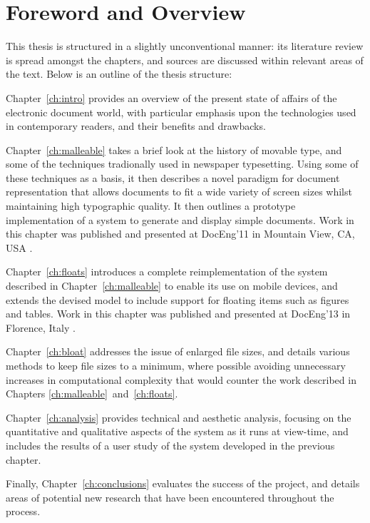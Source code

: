 \chapter{Foreword and Overview}
This thesis is structured in a slightly unconventional manner: its literature review is spread amongst the chapters, and sources are discussed within relevant areas of the text. Below is an outline of the thesis structure:

\vspace{1em}
\noindent Chapter~\ref{ch:intro} provides an overview of the present state of affairs of the electronic document world, with particular emphasis upon the technologies used in contemporary \ebook{} readers, and their benefits and drawbacks.

\vspace{1em}
\noindent Chapter~\ref{ch:malleable} takes a brief look at the history of movable type, and some of the techniques tradionally used in newspaper typesetting. Using some of these techniques as a basis, it then describes a novel paradigm for document representation that allows documents to fit a wide variety of screen sizes whilst maintaining high typographic quality. It then outlines a prototype implementation of a system to generate and display simple documents. Work in this chapter was published and presented at DocEng'11 in Mountain View, CA, USA \cite{Pinkney2011}.

\vspace{1em}
\noindent Chapter~\ref{ch:floats} introduces a complete reimplementation of the system described in Chapter~\ref{ch:malleable} to enable its use on mobile devices, and extends the devised model to include support for floating items such as figures and tables. Work in this chapter was published and presented at DocEng'13 in Florence, Italy \cite{Pinkney2013}.

\vspace{1em}
\noindent Chapter~\ref{ch:bloat} addresses the issue of enlarged file sizes, and details various methods to keep file sizes to a minimum, where possible avoiding unnecessary increases in computational complexity that would counter the work described in Chapters \ref{ch:malleable}~and~\ref{ch:floats}.

\vspace{1em}
\noindent Chapter~\ref{ch:analysis} provides technical and aesthetic analysis, focusing on the quantitative and qualitative aspects of the system as it runs at view-time, and includes the results of a user study of the system developed in the previous chapter.

\vspace{1em}
\noindent Finally, Chapter~\ref{ch:conclusions} evaluates the success of the project, and details areas of potential new research that have been encountered throughout the process.

